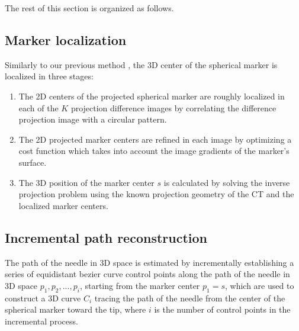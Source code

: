 \documentclass[letterpaper, 10 pt, conference]{ieeeconf}  %
\begin{document}
The rest of this section is organized as follows. 


\subsection{Marker localization}
Similarly to our previous method \cite{medan2017reduced}, the 3D center of the spherical marker is localized in three stages:

\begin{enumerate}

\item The 2D centers of the projected spherical marker are roughly localized in each of the $K$ projection difference images by correlating the difference projection image with a circular pattern.

\item The 2D projected marker centers are reﬁned in each image by optimizing a cost function which takes into account the image gradients of the marker's surface.

\item The 3D position of the marker center $s$ is calculated by solving the inverse projection problem using the known projection geometry of the CT and the localized marker centers.

\end{enumerate}

\subsection{Incremental path reconstruction}

The path of the needle in 3D space is estimated by incrementally establishing a series of equidistant bezier curve control points along the path of the needle in 3D space $p_1, p_2, ..., p_i$, starting from the marker center $p_1=s$, which are used to construct a 3D curve $C_i$ tracing the path of the needle from the center of the spherical marker toward the tip, where $i$ is the number of control points in the incremental process. 
\end{document}
